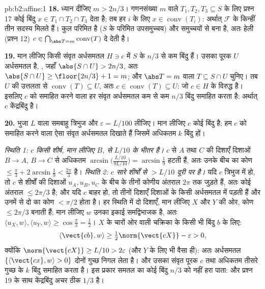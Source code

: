 \begin{solution}{pb:b2:affine:1}
\textbf{18.} ध्यान दीजिए $m > 2n/3$। गणनसंख्या $m$ वाले $T_1, T_2, T_3 \subseteq S$ के लिए प्रश्न 17 कोई
बिंदु $x \in T_1
\cap T_2 \cap T_3$ देता है; तब हर $i$ के लिए $x \in \operatorname{conv}(T_i)$: अर्थात् $\mathcal F$ के किन्हीं तीन सदस्य
मिलते हैं। कुल परिमित है ($S$ के परिमित उपसमुच्चय) और  समुच्चयों से
बना है, अतः हेली (प्रश्न 12) $c \in
\bigcap_{\abs T = m}\operatorname{conv}(T)$ दे देती है।

\textbf{19.} मान लीजिए किसी संवृत अर्धसमतल $H \ni c$ में $S$ के $n/3$ से कम बिंदु
हैं। उसका पूरक $U$  अर्धसमतल है, , जहाँ $\abs{S \cap U} > 2n/3$, अतः $\abs{S \cap U} \geq \floor{2n/3} + 1 = m$; और $\abs T = m$
वाला $T
\subseteq S \cap U$ चुनिए। तब $U$ की उत्तलता से $\operatorname{conv}(T) \subseteq U$, अतः $c \in \operatorname{conv}(T) \subseteq U$: जो $c \in H$ के विरुद्ध है।
इसलिए $c$ को समाहित करने वाला हर संवृत अर्धसमतल कम से कम $n/3$ बिंदु
समाहित करता है: अर्थात् $c$ केंद्रबिंदु है।

\textbf{20.} भुजा $L$ वाला समबाहु त्रिभुज और $\varepsilon = L/100$ लीजिए। मान लीजिए $c$ कोई
बिंदु है; हम $c$ को समाहित करने वाला ऐसा संवृत अर्धसमतल दिखाते हैं जिसमें
अधिकतम $k$ बिंदु हों।

\emph{स्थिति 1: $c$ किसी शीर्ष, मान लीजिए $B$, से $L/10$ के भीतर है।} $c$ से
$A$ तथा $C$ की दिशाएँ दिशाओं $B \to A$, $B \to C$ से अधिकतम
$\arcsin\bigl(\tfrac{L/10}{9L/10}\bigr) = \arcsin\tfrac19$
हटती हैं, अतः उनके बीच का कोण $\leq \tfrac\pi3 + 2\arcsin\tfrac19 <
\tfrac{2\pi}3$ है। \emph{स्थिति 2: $c$ सारे शीर्षों से
$> L/10$ दूरी पर है।} यदि $c$ त्रिभुज में हो, तो $c$ से शीर्षों की दिशाओं
$u_A, u_B, u_C$ के बीच के तीनों कोणीय अंतराल $2\pi$ तक जुड़ते हैं, अतः कोई अंतराल $\leq 2\pi/3$
है; और यदि $c$ बाहर हो, तो तीनों दिशाएँ दिशाओं के किसी  अर्धसमतल में
पड़ती हैं और उनमें से दो का कोण $<
\pi/2$ होता है। हर स्थिति में दो दिशाएँ, मान
लीजिए $X$ और $Y$ की ओर, कोण $\leq 2\pi/3$ बनाती हैं; मान लीजिए $w$ उनका इकाई
समद्विभाजक है, अतः $\langle u_X, w\rangle, \langle u_Y, w\rangle \geq
\cos\tfrac\pi3 = \tfrac12$। $X$ के चारों ओर वाली चक्रिका के किसी भी बिंदु
$b$ के लिए:
\[
\langle \vect{cb}, w\rangle \geq
\tfrac12\norm{\vect{cX}} - \varepsilon > 0,
\]
क्योंकि $\norm{\vect{cX}} \geq L/10 > 2\varepsilon$ (और $Y$ के लिए भी वैसा ही): अतः  अर्धसमतल $\{\langle \vect{cx},
w\rangle > 0\}$ दोनों
गुच्छ निगल लेता है। और उसका संवृत पूरक $c$ तथा अधिकतम तीसरे गुच्छ के $k$
बिंदु समाहित करता है। इस प्रकार समतल का कोई बिंदु $n/3$ को नहीं हरा पाता:
और प्रश्न 19 के साथ केंद्रबिंदु अचर ठीक $1/3$ है।


\end{solution}
